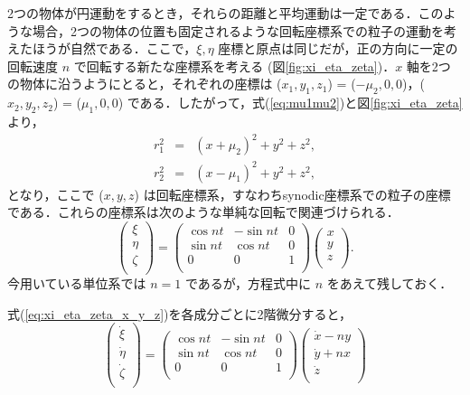 \documentclass[11pt,a4paper,oneside,onecolumn]{jreport}
\begin{document}
2つの物体が円運動をするとき，それらの距離と平均運動は一定である．このような場合，2つの物体の位置も固定されるような回転座標系での粒子の運動を考えたほうが自然である．ここで，$\xi, \eta$ 座標と原点は同じだが，正の方向に一定の回転速度 $n$ で回転する新たな座標系を考える (図\ref{fig:xi_eta_zeta})．$x$ 軸を2つの物体に沿うようにとると，それぞれの座標は ($x_1, y_1,z_1$) = ($- \mu_2, 0, 0$)，($x_2, y_2, z_2$) = ($\mu_1, 0, 0$) である．したがって，式(\ref{eq:mu1mu2})と図\ref{fig:xi_eta_zeta} より，
\begin{eqnarray}
r_1^2 & = & (x + \mu_2)^2 + y^2 + z^2,\\
r_2^2 & = & (x - \mu_1)^2 + y^2 + z^2,
\end{eqnarray}
となり，ここで ($x, y, z$) は回転座標系，すなわちsynodic座標系での粒子の座標である．これらの座標系は次のような単純な回転で関連づけられる．
\begin{equation}
\begin{pmatrix}
\xi\\
\eta\\
\zeta\\
\end{pmatrix}
= 
\begin{pmatrix}
\cos nt & - \sin nt & 0\\
\sin nt & \cos nt & 0\\
0 & 0 & 1\\
\end{pmatrix}
\begin{pmatrix}
x\\
y\\
z\\
\end{pmatrix}. \label{eq:xi_eta_zeta_x_y_z}
\end{equation}
今用いている単位系では $n = 1$ であるが，方程式中に $n$ をあえて残しておく．

式(\ref{eq:xi_eta_zeta_x_y_z})を各成分ごとに2階微分すると，
\begin{equation}
\begin{pmatrix}
\dot{\xi}\\
\dot{\eta}\\
\dot{\zeta}\\
\end{pmatrix}
= 
\begin{pmatrix}
\cos nt & - \sin nt & 0\\
\sin nt & \cos nt & 0\\
0 & 0 & 1\\
\end{pmatrix}
\begin{pmatrix}
\dot{x} - ny\\
\dot{y} + nx\\
\dot{z}\\
\end{pmatrix} \label{eq:xidot_etadot_zetadot}
\end{equation}
\end{document}

